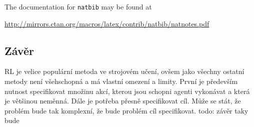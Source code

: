 \documentclass{article}
\begin{document}
The documentation for \verb+natbib+ may be found at
\begin{center}
  \url{http://mirrors.ctan.org/macros/latex/contrib/natbib/natnotes.pdf}
\end{center}


\subsection{Závěr}
RL je velice populární metoda ve strojovém učení, ovšem jako všechny ostatní metody není všehschopná a má vlastní omezení a limity. První je především nutnost specifikovat množinu akcí, kterou jsou schopni agenti vykonávat a která je většinou neměnná. Dále je potřeba přesně specifikovat cíl. Může se stát, že problém bude tak komplexní, že bude problém cíl specifikovat.
todo: závěr taky bude 


  
  
\end{document}

